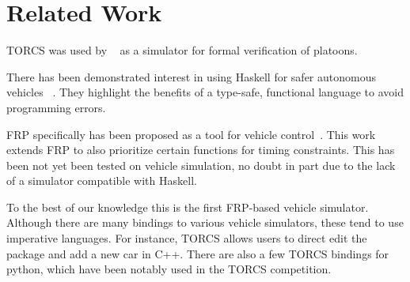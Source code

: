 \section{Related Work}

TORCS was used by ~\cite{kamali2016formal} as a simulator for formal verification of platoons.

There has been demonstrated interest in using Haskell for safer autonomous vehicles ~\cite{pike2014}.
They highlight the benefits of a type-safe, functional language to avoid programming errors.

FRP specifically has been proposed as a tool for vehicle control~\cite{kazemi2016,zou2016}.
This work extends FRP to also prioritize certain functions for timing constraints.
This has been not yet been tested on vehicle simulation, no doubt in part due to the lack of a simulator compatible with Haskell.

To the best of our knowledge this is the first FRP-based vehicle simulator.
Although there are many bindings to various vehicle simulators, these tend to use imperative languages.
For instance, TORCS allows users to direct edit the package and add a new car in C++.
There are also a few TORCS bindings for python, which have been notably used in the TORCS competition.
